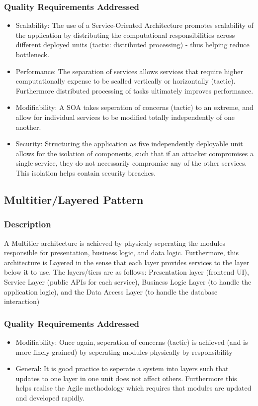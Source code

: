 \documentclass[12pt]{article}
\begin{document}
\subsubsection{Quality Requirements Addressed}
\begin{itemize}
    \item Scalability: The use of a Service-Oriented Architecture promotes scalability of the application by distributing the computational responsibilities across different deployed units (tactic: distributed processing) - thus helping reduce bottleneck.
    \item Performance: The separation of services allows services that require higher computationally expense to be scalled vertically or horizontally (tactic). Furthermore distributed processing of tasks ultimately improves performance.
    \item Modifiability: A SOA takes seperation of concerns (tactic) to an extreme, and allow for individual services to be modified totally independently of one another.
    \item Security: Structuring the application as five independently deployable unit allows for the isolation of components, such that if an attacker compromises a single service, they do not necessarily compromise any of the other services. This isolation helps contain security breaches.
\end{itemize}
\subsection{Multitier/Layered Pattern}
\subsubsection{Description}
A Multitier architecture is achieved by physicaly seperating the modules responsible for presentation, business logic, and data logic. Furthermore, this architecture is Layered in the sense that each layer provides services to the layer below it to use. The layers/tiers are as follows: Presentation layer (frontend UI), Service Layer (public APIs for each service), Business Logic Layer (to handle the application logic), and the Data Access Layer (to handle the database interaction)
\subsubsection{Quality Requirements Addressed}
\begin{itemize}
    \item Modifiability: Once again, seperation of concerns (tactic) is achieved (and is more finely grained) by seperating modules physically by responsibility
    \item General: It is good practice to seperate a system into layers such that updates to one layer in one unit does not affect others. Furthermore this helps realise the Agile methodology which requires that modules are updated and developed rapidly.
\end{itemize}
\end{document}
